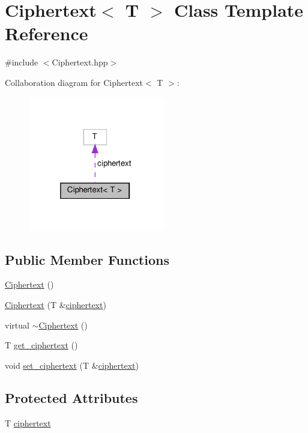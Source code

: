 \hypertarget{classCiphertext}{}\section{Ciphertext$<$ T $>$ Class Template Reference}
\label{classCiphertext}


{\ttfamily \#include $<$Ciphertext.\+hpp$>$}



Collaboration diagram for Ciphertext$<$ T $>$\+:
\nopagebreak
\begin{figure}[H]
\begin{center}
\leavevmode
\includegraphics[width=169pt]{classCiphertext__coll__graph}
\end{center}
\end{figure}
\subsection*{Public Member Functions}
\begin{DoxyCompactItemize}
\item 
\hyperlink{classCiphertext_a658bbd14ee1a3683309878e54b575c8f}{Ciphertext} ()
\item 
\hyperlink{classCiphertext_ab04b602d489978f0e511d797b8a8157d}{Ciphertext} (T \&\hyperlink{classCiphertext_adef9aae9d923eb100b4a1ad58ce495f1}{ciphertext})
\item 
virtual \hyperlink{classCiphertext_ab8a4e685883bcc8fbabde6d3c3cb5fd5}{$\sim$\+Ciphertext} ()
\item 
T \hyperlink{classCiphertext_a42d2210e9b019ce36a401ad9a97d03ac}{get\+\_\+ciphertext} ()
\item 
void \hyperlink{classCiphertext_a8ea04527ee2a98ef214edfd8bd0156f8}{set\+\_\+ciphertext} (T \&\hyperlink{classCiphertext_adef9aae9d923eb100b4a1ad58ce495f1}{ciphertext})
\end{DoxyCompactItemize}
\subsection*{Protected Attributes}
\begin{DoxyCompactItemize}
\item 
T \hyperlink{classCiphertext_adef9aae9d923eb100b4a1ad58ce495f1}{ciphertext}
\end{DoxyCompactItemize}


